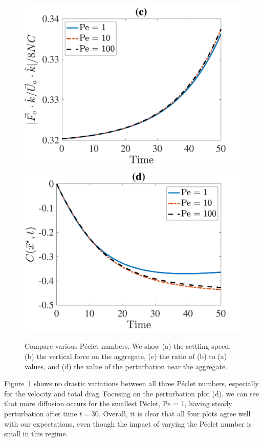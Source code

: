 \begin{figure}[ht]
\begin{center}
		\includegraphics[scale=0.35]{./figures/fig_NC50_Pe_Fo3Ua_ratio}
		\includegraphics[scale=0.35]{./figures/fig_NC50_Pe_C_star}
	\caption{Compare various Péclet numbers. We show (a) the settling speed, (b) the vertical force on the aggregate, (c) the ratio of (b) to (a) values, and (d) the value of the perturbation near the aggregate.}
	\label{fig_NC50_Pe}
\end{center}
\end{figure}
\par
Figure~\ref{fig_NC50_Pe} shows no drastic variations between all three Péclet numbers, especially for the velocity and total drag. 
Focusing on the perturbation plot (d), we can see that more diffusion occurs for the smallest Péclet, Pe = 1, having steady perturbation after time $t = 30$.
Overall, it is clear that all four plots agree well with our expectations, even though the impact of varying the Péclet number is small in this regime. 
